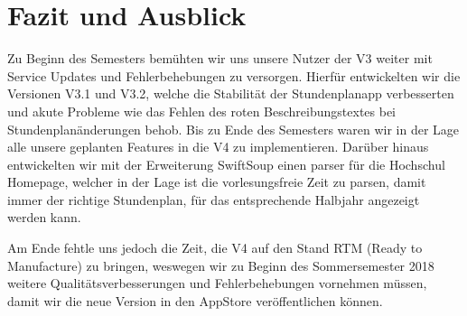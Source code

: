 \section{Fazit und Ausblick}
Zu Beginn des Semesters bemühten wir uns unsere Nutzer der V3 weiter mit Service Updates und Fehlerbehebungen zu versorgen. Hierfür entwickelten wir die Versionen V3.1 und V3.2, welche die Stabilität der Stundenplanapp verbesserten und akute Probleme wie das Fehlen des roten Beschreibungstextes bei Stundenplanänderungen behob.
Bis zu Ende des Semesters waren wir in der Lage alle unsere geplanten Features in die V4 zu implementieren. Darüber hinaus entwickelten wir mit der Erweiterung SwiftSoup einen parser für die Hochschul Homepage, welcher in der Lage ist die vorlesungsfreie Zeit zu parsen, damit immer der richtige Stundenplan, für das entsprechende Halbjahr angezeigt werden kann.

Am Ende fehtle uns jedoch die Zeit, die V4 auf den Stand RTM (Ready to Manufacture) zu bringen, weswegen wir zu Beginn des Sommersemester 2018 weitere Qualitätsverbesserungen und Fehlerbehebungen vornehmen müssen, damit wir die neue Version in den AppStore veröffentlichen können.


